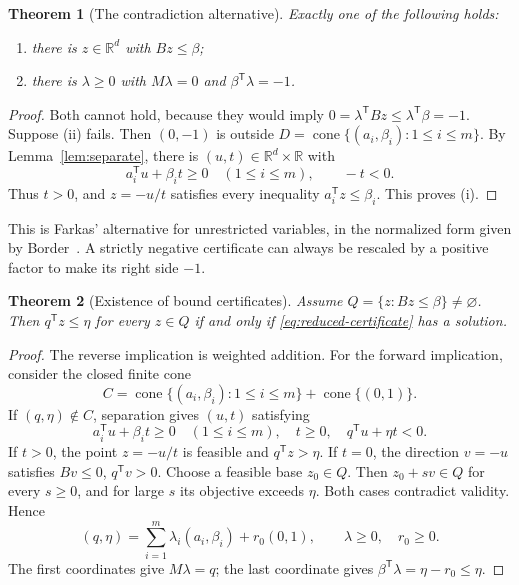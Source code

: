 \documentclass[11pt,letterpaper]{article}
\newcommand{\R}{\mathbb R}
\newcommand{\T}{\mathsf T}
\DeclareMathOperator{\cone}{cone}
\newtheorem{theorem}{Theorem}[section]
\theoremstyle{definition}
\theoremstyle{remark}
\numberwithin{equation}{section}
\begin{document}
\begin{theorem}[The contradiction alternative]\label{thm:farkas}
Exactly one of the following holds:
\begin{enumerate}[label=(\roman*)]
\item there is \(z\in\R^d\) with \(Bz\le\beta\);
\item there is \(\lambda\ge0\) with \(M\lambda=0\) and
      \(\beta^\T\lambda=-1\).
\end{enumerate}
\end{theorem}
\begin{proof}
Both cannot hold, because they would imply
\(0=\lambda^\T Bz\le\lambda^\T\beta=-1\).
Suppose (ii) fails. Then \((0,-1)\) is outside
\(D=\cone\{(a_i,\beta_i):1\le i\le m\}\).
By Lemma~\ref{lem:separate}, there is \((u,t)\in\R^d\times\R\) with
\[
 a_i^\T u+\beta_i t\ge0\quad(1\le i\le m),\qquad -t<0.
\]
Thus \(t>0\), and \(z=-u/t\) satisfies every inequality
\(a_i^\T z\le\beta_i\). This proves (i).
\end{proof}

This is Farkas' alternative for unrestricted variables, in the normalized
form given by Border~\cite[Proposition 35, p.~17]{border}.
A strictly negative certificate can always be rescaled by a positive factor
to make its right side \(-1\).

\begin{theorem}[Existence of bound certificates]\label{thm:existence}
Assume \(Q=\{z:Bz\le\beta\}\ne\varnothing\).
Then \(q^\T z\le\eta\) for every \(z\in Q\) if and only if
\eqref{eq:reduced-certificate} has a solution.
\end{theorem}
\begin{proof}
The reverse implication is weighted addition. For the forward implication,
consider the closed finite cone
\[
 C=\cone\{(a_i,\beta_i):1\le i\le m\}+\cone\{(0,1)\}.
\]
If \((q,\eta)\notin C\), separation gives \((u,t)\) satisfying
\[
 a_i^\T u+\beta_i t\ge0\quad(1\le i\le m),\quad t\ge0,\quad
 q^\T u+\eta t<0.
\]
If \(t>0\), the point \(z=-u/t\) is feasible and \(q^\T z>\eta\).
If \(t=0\), the direction \(v=-u\) satisfies \(Bv\le0\), \(q^\T v>0\).
Choose a feasible base \(z_0\in Q\). Then \(z_0+s v\in Q\) for every
\(s\ge0\), and for large \(s\) its objective exceeds \(\eta\).
Both cases contradict validity. Hence
\[
 (q,\eta)=\sum_{i=1}^m\lambda_i(a_i,\beta_i)+r_0(0,1),
 \qquad \lambda\ge0,\quad r_0\ge0.
\]
The first coordinates give \(M\lambda=q\); the last coordinate gives
\(\beta^\T\lambda=\eta-r_0\le\eta\).
\end{proof}
\end{document}

